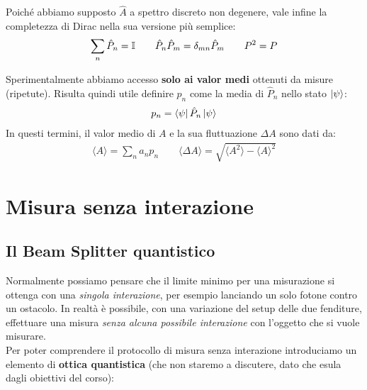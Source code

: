 \documentclass[../../InformazioneQuantistica.tex]{subfiles}
\begin{document}
Poiché abbiamo supposto $\hat{A}$ a spettro discreto non degenere, vale infine la completezza di Dirac nella sua versione più semplice:
\begin{align*}
\sum_n \hat{P}_n = \mathbb{I} \qquad \hat{P}_n \hat{P}_m = \delta_{mn}\hat{P}_m \qquad P^2 = P
\end{align*}

Sperimentalmente abbiamo accesso \textbf{solo ai valor medi} ottenuti da misure (ripetute). Risulta quindi utile definire $p_n$ come la media di $\hat{P}_n$ nello stato $\Ket{\psi}$:
\begin{align*}
p_n = \Bra{\psi}\hat{P}_n \Ket{\psi}
\end{align*}
In questi termini, il valor medio di $A$ e la sua fluttuazione $\Delta A$ sono dati da:
\begin{align*}
\langle A \rangle = \sum_n a_n p_n \qquad \langle \Delta A \rangle =
\sqrt{\langle A^2 \rangle - \langle A\rangle^2}
\end{align*}

\section{Misura senza interazione}

\subsection{Il Beam Splitter quantistico}
Normalmente possiamo pensare che il limite minimo per una misurazione si ottenga con una \textit{singola interazione}, per esempio lanciando un solo fotone contro un ostacolo. In realtà è possibile, con una variazione del setup delle due fenditure, effettuare una misura \textit{senza alcuna possibile interazione} con l'oggetto che si vuole misurare.\\

Per poter comprendere il protocollo di misura senza interazione introduciamo un elemento di \textbf{ottica quantistica} (che non staremo a discutere, dato che esula dagli obiettivi del corso):
\end{document}
